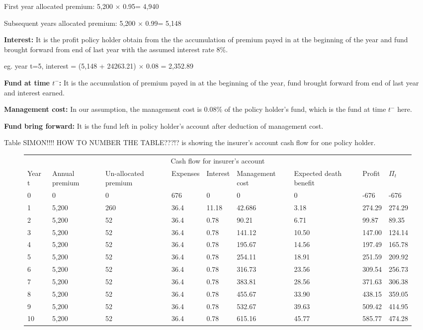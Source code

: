 \documentclass{report}
\begin{document}
First year allocated premium:                5,200 $\times$ 0.95= 4,940

Subsequent years allocated premium:   5,200 $\times$ 0.99= 5,148

\textbf{Interest:} It is the profit policy holder obtain from the the accumulation of premium payed in at the beginning of the year and fund brought forward from end of last year with the assumed interest rate 8\%.

eg.  year t=5, interest = (5,148 + 24263.21) $\times$ 0.08 = 2,352.89

\textbf{Fund at time $t^-$:} It is the accumulation of premium payed in at the beginning of the year, fund brought forward from end of last year and interest earned.

\textbf{Management cost:} In our assumption, the management cost is 0.08\% of the policy holder's fund, which is the fund at time $t^-$ here. 

\textbf{Fund bring forward:} It is the fund left in policy holder's account after deduction of management cost. 


Table SIMON!!!! HOW TO NUMBER THE TABLE???!? is showing the insurer's account cash flow for one policy holder. 


\begin{figure}[H]
\hfill
\begin{tabular}{p{0.8cm} p{1.5cm} p{1.5cm} p{1.2cm} p{1cm} p{2cm}p{1.5cm} p{1.5cm} p{1.5cm} }
\toprule
\multicolumn{9}{c}{Cash flow for insurer's account} \\
\cmidrule(r){3-7}

Year t & Annual premium & Un-allocated premium & Expenses & Interest &Management cost& Expected death benefit & Profit& $\Pi_t$  \\
\midrule

0&0&0&676&0&0&0&-676&-676\\
1&5,200&260&36.4&11.18&42.686&3.18&274.29&274.29\\
2&5,200&52&36.4&0.78&90.21&6.71&99.87&89.35\\
3&5,200&52&36.4&0.78&141.12&10.50&147.00&124.14\\
4&5,200&52&36.4&0.78&195.67&14.56&197.49&165.78\\
5&5,200&52&36.4&0.78&254.11&18.91&251.59&209.92\\
6&5,200&52&36.4&0.78&316.73&23.56&309.54&256.73\\
7&5,200&52&36.4&0.78&383.81&28.56&371.63&306.38\\
8&5,200&52&36.4&0.78&455.67&33.90&438.15&359.05\\
9&5,200&52&36.4&0.78&532.67&39.63&509.42&414.95\\
10&5,200&52&36.4&0.78&615.16&45.77&585.77&474.28\\

\bottomrule
\end{tabular}
\end{figure}
\end{document}
